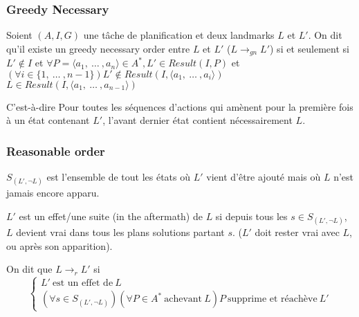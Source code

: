 \begin{frame}
  \frametitle{Greedy Necessary}

  \begin{definition}[$L \rightarrow_{gn} L'$]
     Soient $(A, I, G)$ une tâche de planification et deux landmarks $L$ et $L'$. On dit qu'il existe un greedy necessary order entre $L$ et $L'$ ($L \rightarrow_{gn} L'$) si et seulement si\\
    $L' \notin  I$ et $\forall P = \langle a_1,~\dots~, a_n\rangle \in A^*, L' \in Result(I, P)$ et $(\forall i \in \{1,~\dots~, n-1\}) L' \notin Result(I, \langle a_1,~\dots~,a_i\rangle)$
    $L \in Result(I, \langle a_1,~\dots~, a_{n-1}\rangle)$
  \end{definition}

  \begin{block}{C'est-à-dire}
    Pour toutes les séquences d'actions qui amènent pour la première fois à un état contenant $L'$, l'avant dernier état contient nécessairement $L$.
  \end{block}
\end{frame}

\begin{frame}
  \frametitle{Reasonable order}

  \begin{definition}[$S_{(L',\lnot L)}$]
    $S_{(L',\lnot L)}$ est l'ensemble de tout les états où $L'$ vient d'être ajouté mais où $L$ n'est jamais encore apparu.
  \end{definition}

  \begin{definition}[Aftermath]
    $L'$ est un effet/une suite (in the aftermath) de $L$ si depuis tous les $s \in S_{(L', \lnot L)}$, $L$ devient vrai dans tous les plans solutions partant $s$. ($L'$ doit rester vrai avec $L$, ou après son apparition).
  \end{definition}

  \begin{definition}[$L \rightarrow_r L'$]
    On dit que  $L \rightarrow_r L'$ si
    \begin{equation*}
      \begin{cases}
        L'~\text{est un effet de}~L\\
        (\forall s \in S_{(L', \lnot L)})(\forall P \in A^*~\text{achevant}~L) P~\text{supprime et réachève}~L'
      \end{cases}
    \end{equation*}
  \end{definition}
\end{frame}

